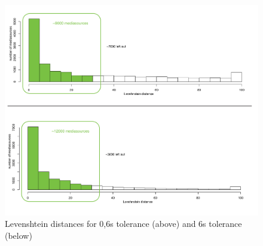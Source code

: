 
\begin{figure}[t]
\begin{center}
\includegraphics[width=\textwidth]{figures/histograms.pdf}
\end{center}
\caption{Levenshtein distances for 0,6s tolerance (above) and 6s tolerance (below)}\label{histograms}
\end{figure}

